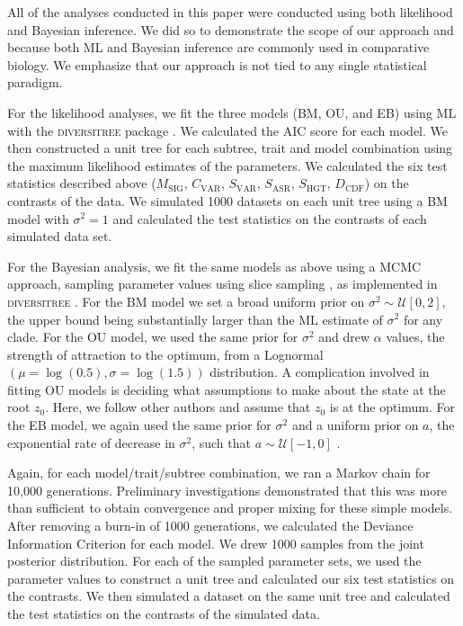 All of the analyses conducted in this paper were conducted using both likelihood and Bayesian inference. We did so to demonstrate the scope of our approach and because both ML and Bayesian inference are commonly used in comparative biology. We emphasize that our approach is not tied to any single statistical paradigm.

For the likelihood analyses, we fit the three models (BM, OU, and EB) using ML with the \textsc{diversitree} package \citep{FitzJohn2012}. We calculated the AIC score for each model. We then constructed a unit tree for each subtree, trait and model combination using the maximum likelihood estimates of the parameters. We calculated the six test statistics described above ($M_{\text{SIG}}$, $C_{\text{VAR}}$, $S_{\text{VAR}}$, $S_{\text{ASR}}$, $S_{\text{HGT}}$, $D_{\text{CDF}}$) on the contrasts of the data. We simulated 1000 datasets on each unit tree using a BM model with $\sigma^2=1$ and calculated the test statistics on the contrasts of each simulated data set. 

For the Bayesian analysis, we fit the same models as above using a MCMC approach, sampling parameter values using slice sampling \citep{Nealslice}, as implemented in  \textsc{diversitree} \citep{FitzJohn2012}. For the BM model we set a broad uniform prior on $\sigma^2 \sim \mathcal{U}[0, 2]$, the upper bound being substantially larger than the ML estimate of $\sigma^2$ for any clade. For the OU model, we used the same prior for $\sigma^2$ and drew $\alpha$ values, the strength of attraction to the optimum, from a Lognormal$(\mu=\log(0.5),\sigma= \log(1.5))$ distribution. A complication involved in fitting OU models is deciding what assumptions to make about the state at the root $z_0$. Here, we follow other authors \citep{ButlerKing2004,Harmon2010} and assume that $z_0$ is at the optimum. For the EB model, we again used the same prior for $\sigma^2$ and a uniform prior on $a$, the exponential rate of decrease in $\sigma^2$, such that $a \sim \mathcal{U}[-1, 0]$ \citep[the minimum value is much more negative than we would typically expect;][]{SlaterPennell}.

Again, for each model/trait/subtree combination, we ran a Markov chain for 10,000 generations. Preliminary investigations demonstrated that this was more than sufficient to obtain convergence and proper mixing for these simple models. After removing a burn-in of 1000 generations, we calculated the Deviance Information Criterion \citep[DIC, a Bayesian analog of AIC;][]{dic} for each model. We drew 1000 samples from the joint posterior distribution. For each of the sampled parameter sets, we used the parameter values to construct a unit tree and calculated our six test statistics on the contrasts. We then simulated a dataset on the same unit tree and calculated the test statistics on the contrasts of the simulated data. 

